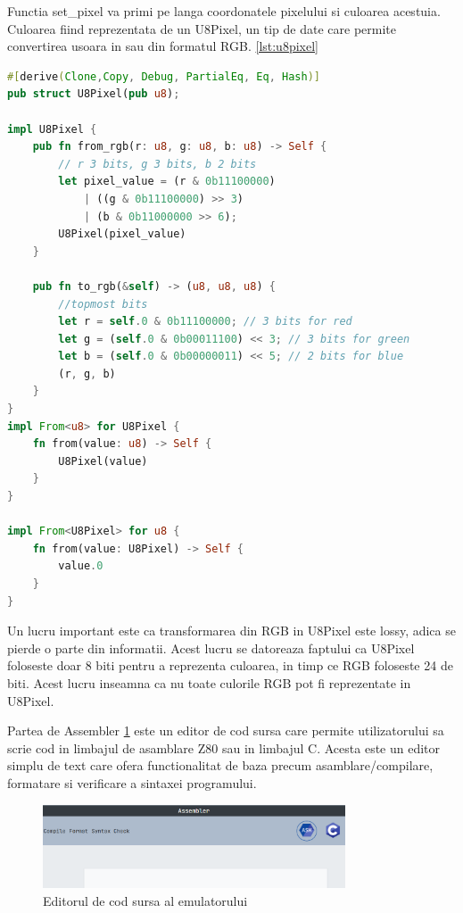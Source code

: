 \documentclass[titlepage,12pt]{article}
\DeclareRobustCommand{\code}[1]{{\ttfamily\small #1}}
\begin{document}
Functia \code{set\_pixel} va primi pe langa coordonatele pixelului si culoarea acestuia. Culoarea fiind reprezentata de un \code{U8Pixel}, un tip de date care permite convertirea usoara in sau din formatul RGB. \cref{lst:u8pixel}

\begin{lstlisting}[language=Rust,caption={Tipul de date U8Pixel},label={lst:u8pixel}]
#[derive(Clone,Copy, Debug, PartialEq, Eq, Hash)]
pub struct U8Pixel(pub u8);

impl U8Pixel {
    pub fn from_rgb(r: u8, g: u8, b: u8) -> Self {
        // r 3 bits, g 3 bits, b 2 bits
        let pixel_value = (r & 0b11100000)
            | ((g & 0b11100000) >> 3)
            | (b & 0b11000000 >> 6);
        U8Pixel(pixel_value)
    }

    pub fn to_rgb(&self) -> (u8, u8, u8) {
        //topmost bits
        let r = self.0 & 0b11100000; // 3 bits for red
        let g = (self.0 & 0b00011100) << 3; // 3 bits for green
        let b = (self.0 & 0b00000011) << 5; // 2 bits for blue
        (r, g, b)
    }
}
impl From<u8> for U8Pixel {
    fn from(value: u8) -> Self {
        U8Pixel(value)
    }
}

impl From<U8Pixel> for u8 {
    fn from(value: U8Pixel) -> Self {
        value.0
    }
}
\end{lstlisting}

Un lucru important este ca transformarea din RGB in U8Pixel este \code{lossy}, adica se pierde o parte din informatii. Acest lucru se datoreaza faptului ca U8Pixel foloseste doar 8 biti pentru a reprezenta culoarea, in timp ce RGB foloseste 24 de biti. Acest lucru inseamna ca nu toate culorile RGB pot fi reprezentate in U8Pixel.

Partea de \code{Assembler} \cref{fig:assembler} este un editor de cod sursa care permite utilizatorului sa scrie cod in limbajul de asamblare Z80 sau in limbajul C. Acesta este un editor simplu de text care ofera functionalitat de baza precum asamblare/compilare, formatare si verificare a sintaxei programului.

\begin{figure}[H]
    \centering
    \includegraphics[width=0.8\textwidth]{images/assembler.png}
    \caption{Editorul de cod sursa al emulatorului}
    \label{fig:assembler}
\end{figure}
\end{document}
